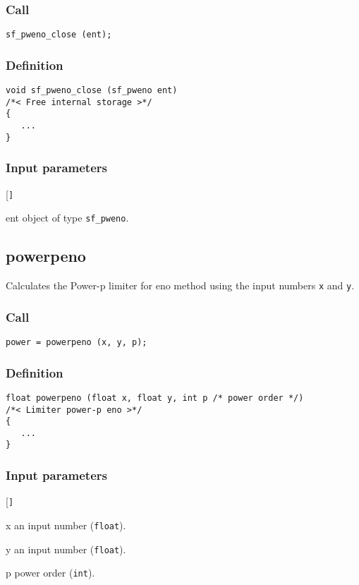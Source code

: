 \subsubsection*{Call}
\begin{verbatim}sf_pweno_close (ent);\end{verbatim}

\subsubsection*{Definition}
\begin{verbatim}
void sf_pweno_close (sf_pweno ent)
/*< Free internal storage >*/
{
   ...
}
\end{verbatim}

\subsubsection*{Input parameters}
\begin{desclist}{\tt }{\quad}[\tt ]
   \setlength\itemsep{0pt}
   \item[ent] object of type \texttt{sf\_pweno}.
\end{desclist}




\subsection{{powerpeno}}
Calculates the Power-p limiter for eno method using the input numbers \texttt{x} and \texttt{y}.

\subsubsection*{Call}
\begin{verbatim}power = powerpeno (x, y, p);\end{verbatim}

\subsubsection*{Definition}
\begin{verbatim}
float powerpeno (float x, float y, int p /* power order */)
/*< Limiter power-p eno >*/
{
   ...
}
\end{verbatim}

\subsubsection*{Input parameters}
\begin{desclist}{\tt }{\quad}[\tt ]
   \setlength\itemsep{0pt}
   \item[x] an input number (\texttt{float}). 
   \item[y] an input number (\texttt{float}). 
   \item[p] power order (\texttt{int}).  
\end{desclist}


